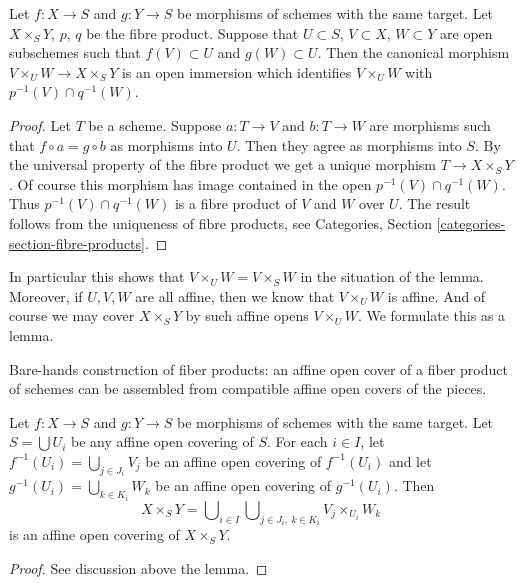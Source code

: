 \begin{lemma}
\label{lemma-open-fibre-product}
Let $f : X \to S$ and $g : Y \to S$ be morphisms of schemes
with the same target. Let $X \times_S Y$, $p$, $q$ be the fibre product.
Suppose that $U \subset S$,
$V \subset X$, $W \subset Y$ are open subschemes
such that $f(V) \subset U$ and $g(W) \subset U$.
Then the canonical morphism
$V \times_U W \to X \times_S Y$ is an open immersion
which identifies $V \times_U W$ with $p^{-1}(V) \cap q^{-1}(W)$.
\end{lemma}

\begin{proof}
Let $T$ be a scheme.
Suppose $a : T \to V$ and $b : T \to W$ are morphisms
such that $f \circ a = g \circ b$ as morphisms into $U$.
Then they agree as morphisms into $S$.
By the universal property of the fibre product we get
a unique morphism $T \to X \times_S Y$. Of course this morphism
has image contained in the open $p^{-1}(V) \cap q^{-1}(W)$.
Thus $p^{-1}(V) \cap q^{-1}(W)$ is a fibre product of
$V$ and $W$ over $U$. The result follows from the uniqueness
of fibre products, see Categories, Section
\ref{categories-section-fibre-products}.
\end{proof}

\noindent
In particular this shows that $V \times_U W = V \times_S W$
in the situation of the lemma. Moreover, if $U, V, W$ are all
affine, then we know that $V \times_U W$ is affine. And of course
we may cover $X \times_S Y$ by such affine opens $V \times_U W$.
We formulate this as a lemma.

\begin{lemma}
\label{lemma-affine-covering-fibre-product}
\begin{slogan}
Bare-hands construction of fiber products: an affine open cover of a
fiber product of schemes can be assembled from compatible
affine open covers of the pieces.
\end{slogan}
Let $f : X \to S$ and $g : Y \to S$ be morphisms of schemes
with the same target. Let $S = \bigcup U_i$ be any affine open
covering of $S$. For each $i \in I$, let
$f^{-1}(U_i) = \bigcup_{j \in J_i} V_j$ be an affine open covering
of $f^{-1}(U_i)$ and let
$g^{-1}(U_i) = \bigcup_{k \in K_i} W_k$ be an affine open covering
of $g^{-1}(U_i)$. Then
$$
X \times_S Y =
\bigcup\nolimits_{i \in I}
\bigcup\nolimits_{j \in J_i, \ k \in K_i}
V_j \times_{U_i} W_k
$$
is an affine open covering of $X \times_S Y$.
\end{lemma}

\begin{proof}
See discussion above the lemma.
\end{proof}

